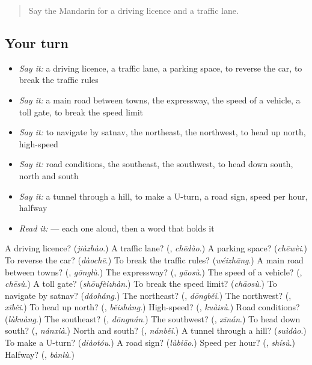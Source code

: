 \label{lesson:ZH-R424-review-420-424}



\begin{quote}
Say the Mandarin for a driving licence and a traffic lane.
\end{quote}

\subsection*{Your turn}
\begin{itemize}
\raggedright
  \item \emph{Say it:} a driving licence, a traffic lane, a parking space, to reverse the car, to break the traffic rules
  \item \emph{Say it:} a main road between towns, the expressway, the speed of a vehicle, a toll gate, to break the speed limit
  \item \emph{Say it:} to navigate by satnav, the northeast, the northwest, to head up north, high-speed
  \item \emph{Say it:} road conditions, the southeast, the southwest, to head down south, north and south
  \item \emph{Say it:} a tunnel through a hill, to make a U-turn, a road sign, speed per hour, halfway
  \item \emph{Read it:}    — each one aloud, then a word that holds it
\end{itemize}

\begin{tcolorbox}[breakable,colback=teal!4,colframe=teal!35!black,title={Before you move on}]
A driving licence? (\emph{jiàzhào}.) A traffic lane? (\textbf{}, \emph{chēdào}.) A parking space? (\emph{chēwèi}.) To reverse the car? (\emph{dàochē}.) To break the traffic rules? (\emph{wéizhāng}.) A main road between towns? (\textbf{}, \emph{gōnglù}.) The expressway? (\textbf{}, \emph{gāosù}.) The speed of a vehicle? (\textbf{}, \emph{chēsù}.) A toll gate? (\emph{shōufèizhàn}.) To break the speed limit? (\emph{chāosù}.) To navigate by satnav? (\emph{dǎoháng}.) The northeast? (\textbf{}, \emph{dōngběi}.) The northwest? (\textbf{}, \emph{xīběi}.) To head up north? (\textbf{}, \emph{běishàng}.) High-speed? (\textbf{}, \emph{kuàisù}.) Road conditions? (\emph{lùkuàng}.) The southeast? (\textbf{}, \emph{dōngnán}.) The southwest? (\textbf{}, \emph{xīnán}.) To head down south? (\textbf{}, \emph{nánxià}.) North and south? (\textbf{}, \emph{nánběi}.) A tunnel through a hill? (\emph{suìdào}.) To make a U-turn? (\emph{diàotóu}.) A road sign? (\emph{lùbiāo}.) Speed per hour? (\textbf{}, \emph{shísù}.) Halfway? (\textbf{}, \emph{bànlù}.)
\end{tcolorbox}
